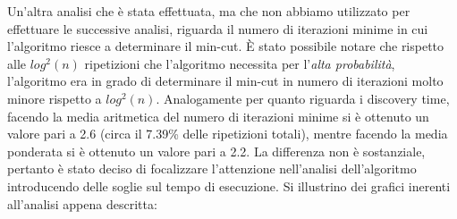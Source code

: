 Un'altra analisi che è stata effettuata, ma che non abbiamo utilizzato per effettuare 
le successive analisi, riguarda il numero di iterazioni minime in cui l'algoritmo  
riesce a determinare il min-cut. È stato possibile notare che rispetto alle $log^{2}(n)$ 
ripetizioni che l'algoritmo necessita per l'\textit{alta probabilità}, l'algoritmo 
era in grado di determinare il min-cut in numero di iterazioni molto minore rispetto a 
$log^{2}(n)$. Analogamente per quanto riguarda i discovery time, facendo la media 
aritmetica del numero di iterazioni minime si è ottenuto un valore pari a 2.6 
(circa il 7.39\% delle ripetizioni totali), mentre facendo la media ponderata si è 
ottenuto un valore pari a 2.2. La differenza non è sostanziale, pertanto è stato 
deciso di focalizzare l'attenzione nell'analisi dell'algoritmo introducendo delle 
soglie sul tempo di esecuzione. Si illustrino dei grafici inerenti all'analisi appena 
descritta:

